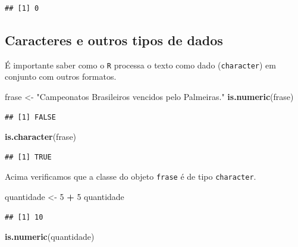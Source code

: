 \documentclass[]{book}
\newenvironment{Shaded}{\begin{snugshade}}{\end{snugshade}}
\newcommand{\DecValTok}[1]{\textcolor[rgb]{0.00,0.00,0.81}{#1}}
\newcommand{\KeywordTok}[1]{\textcolor[rgb]{0.13,0.29,0.53}{\textbf{#1}}}
\newcommand{\NormalTok}[1]{#1}
\newcommand{\OperatorTok}[1]{\textcolor[rgb]{0.81,0.36,0.00}{\textbf{#1}}}
\newcommand{\StringTok}[1]{\textcolor[rgb]{0.31,0.60,0.02}{#1}}
\begin{document}
\begin{verbatim}
## [1] 0
\end{verbatim}

\hypertarget{caracteres-e-outros-tipos-de-dados}{%
\subsection{Caracteres e outros tipos de dados}\label{caracteres-e-outros-tipos-de-dados}}

É importante saber como o \texttt{R} processa o texto como dado (\texttt{character}) em conjunto com outros formatos.

\begin{Shaded}
\begin{Highlighting}[]
\NormalTok{frase <-}\StringTok{ "Campeonatos Brasileiros vencidos pelo Palmeiras."}
\KeywordTok{is.numeric}\NormalTok{(frase)}
\end{Highlighting}
\end{Shaded}

\begin{verbatim}
## [1] FALSE
\end{verbatim}

\begin{Shaded}
\begin{Highlighting}[]
\KeywordTok{is.character}\NormalTok{(frase)}
\end{Highlighting}
\end{Shaded}

\begin{verbatim}
## [1] TRUE
\end{verbatim}

Acima verificamos que a classe do objeto \texttt{frase} é de tipo \texttt{character}.

\begin{Shaded}
\begin{Highlighting}[]
\NormalTok{quantidade <-}\StringTok{ }\DecValTok{5} \OperatorTok{+}\StringTok{ }\DecValTok{5}
\NormalTok{quantidade}
\end{Highlighting}
\end{Shaded}

\begin{verbatim}
## [1] 10
\end{verbatim}

\begin{Shaded}
\begin{Highlighting}[]
\KeywordTok{is.numeric}\NormalTok{(quantidade)}
\end{Highlighting}
\end{Shaded}
\end{document}
